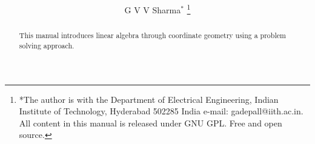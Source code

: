 \documentclass[journal,12pt,twocolumn]{IEEEtran}
\renewcommand\thesection{\arabic{section}}
\begin{document}
\let\StandardTheFigure\thefigure
\renewcommand{\thefigure}{\thesection}



\makeatletter
{}
\makeatother

\let\StandardTheFigure\thefigure
\let\StandardTheTable\thetable
\let\vec\mathbf





\def\putbox#1#2#3{\makebox[0in][l]{\makebox[#1][l]{}\raisebox{\baselineskip}[0in][0in]{\raisebox{#2}[0in][0in]{#3}}}}
     \def\rightbox#1{\makebox[0in][r]{#1}}
     \def\centbox#1{\makebox[0in]{#1}}
     \def\topbox#1{\raisebox{-\baselineskip}[0in][0in]{#1}}
     \def\midbox#1{\raisebox{-0.5\baselineskip}[0in][0in]{#1}}

\vspace{3cm}

\title{ 
}

\author{ G V V Sharma$^{*}$%
	\thanks{*The author is with the Department
		of Electrical Engineering, Indian Institute of Technology, Hyderabad
		502285 India e-mail:  gadepall@iith.ac.in. All content in this manual is released under GNU GPL.  Free and open source.}
	
}	

\maketitle

\tableofcontents

\bigskip

\renewcommand{\thefigure}{\theenumi}
\renewcommand{\thetable}{\theenumi}


\begin{abstract}
	
This manual introduces linear algebra through coordinate geometry using a problem solving approach.
\end{abstract}
\end{document}

